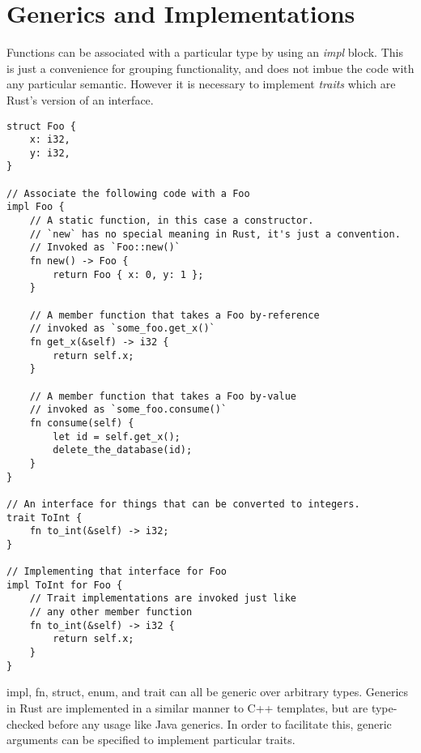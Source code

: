 \section{Generics and Implementations}

Functions can be associated with a particular type by using an \emph{impl}
block. This is just a convenience for grouping functionality, and does not
imbue the code with any particular semantic. However it is necessary to
implement \emph{traits} which are Rust's version of an interface.

\begin{verbatim}
struct Foo {
    x: i32,
    y: i32,
}

// Associate the following code with a Foo
impl Foo {
    // A static function, in this case a constructor.
    // `new` has no special meaning in Rust, it's just a convention.
    // Invoked as `Foo::new()`
    fn new() -> Foo {
        return Foo { x: 0, y: 1 };
    }

    // A member function that takes a Foo by-reference
    // invoked as `some_foo.get_x()`
    fn get_x(&self) -> i32 {
        return self.x;
    }

    // A member function that takes a Foo by-value
    // invoked as `some_foo.consume()`
    fn consume(self) {
        let id = self.get_x();
        delete_the_database(id);
    }
}

// An interface for things that can be converted to integers.
trait ToInt {
    fn to_int(&self) -> i32;
}

// Implementing that interface for Foo
impl ToInt for Foo {
    // Trait implementations are invoked just like
    // any other member function
    fn to_int(&self) -> i32 {
        return self.x;
    }
}
\end{verbatim}



impl, fn, struct, enum, and trait can all be generic over arbitrary types.
Generics in Rust are implemented in a similar manner to C++ templates, but
are type-checked before any usage like Java generics. In order to facilitate
this, generic arguments can be specified to implement particular traits.

